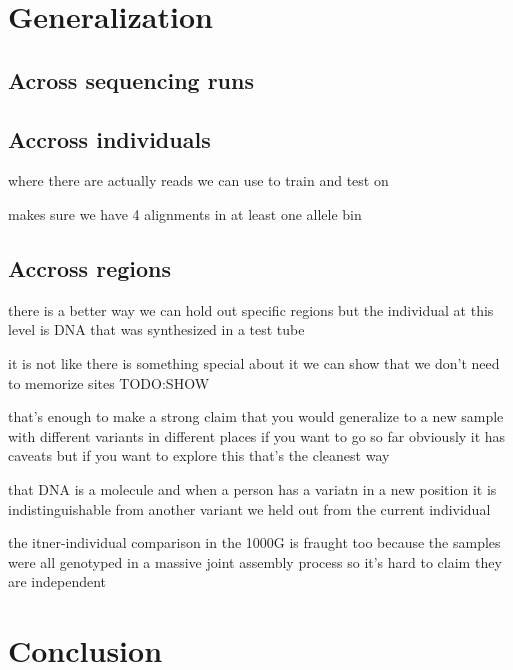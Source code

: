 \documentclass{article}
\begin{document}


\section{Generalization}

\subsection{Across sequencing runs}



\subsection{Accross individuals}
where there are actually reads we can use to train and test on


makes sure we have 4 alignments in at least one allele bin

\subsection{Accross regions}
there is a better way
we can hold out specific regions
but the individual
at this level
is DNA that was synthesized in a test tube

it is not like there is something special about it
we can show that we don't need to memorize sites
TODO:SHOW

that's enough to make a strong claim that you would generalize to a new sample with different variants in different places
if you want to go so far
obviously it has caveats but if you want to explore this that's the cleanest way

that DNA is a molecule and when a person has a variatn in a new position it is indistinguishable from another variant we held out from the current individual

the itner-individual comparison in the 1000G is fraught too
because the samples were all genotyped in a massive joint assembly process
so it's hard to claim they are independent

\section{Conclusion}
\end{document}
